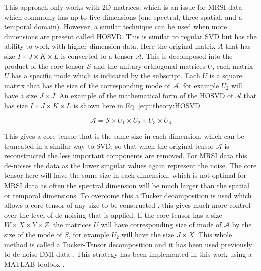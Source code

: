 This approach only works with 2D matrices, which is an issue for \ac{MRSI} data which commonly has up to five dimensions (one spectral, three spatial, and a temporal domain). However, a similar technique can be used when more dimensions are present called \ac{HOSVD}. This is similar to regular \ac{SVD} but has the ability to work with higher dimension data. Here the original matrix $A$ that has size $I \times J \times K \times L$ is converted to a tensor $\mathcal{A}$. This is decomposed into the product of the core tensor $\mathcal{S}$ and the unitary orthogonal matrices $U$, each matrix $U$ has a specific mode which is indicated by the subscript. Each $U$ is a square matrix that has the size of the corresponding mode of $\mathcal{A}$, for example $U_2$ will have a size $J \times J$. An example of the mathematical form of the \ac{HOSVD} of $\mathcal{A}$ that has size $I \times J \times K \times L$ is shown here in Eq. \ref{eqn:theory:HOSVD}

\begin{equation}
    \mathcal{A} = \mathcal{S} \times U_1 \times U_2 \times U_3 \times U_4
    \label{eqn:theory:HOSVD}
\end{equation}

\noindent This gives a core tensor that is the same size in each dimension, which can be truncated in a similar way to \ac{SVD}, so that when the original tensor $\mathcal{A}$ is reconstructed the less important components are removed. For \ac{MRSI} data this de-noises the data as the lower singular values again represent the noise. The core tensor here will have the same size in each dimension, which is not optimal for \ac{MRSI} data as often the spectral dimension will be much larger than the spatial or temporal dimensions. To overcome this a Tucker decomposition is used which allows a core tensor of any size to be constructed \cite{Tucker1966SomeAnalysis}, this gives much more control over the level of de-noising that is applied. If the core tensor has a size $W \times X \times Y \times Z$, the matrices $U$ will have corresponding size of mode of $\mathcal{A}$ by the size of the mode of $S$, for example $U_2$ will have the size $J \times X$. This whole method is called a Tucker-Tensor decomposition and it has been used previously to de-noise \ac{DMI} data \cite{Kreis2020MeasuringMRI, Assmann2020InCholesterol}. This strategy has been implemented in this work using a MATLAB toolbox \cite{Bader2007EfficientTensors}.

